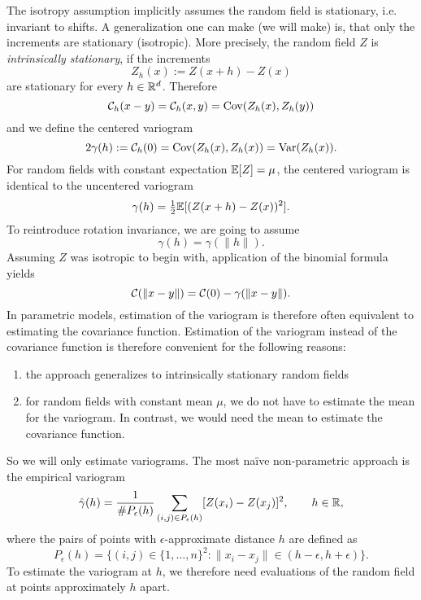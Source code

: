 The isotropy assumption implicitly assumes the random field is stationary,
i.e. invariant to shifts. A generalization one can make (we will make)
is, that only the increments are stationary (isotropic). More precisely, the
random field \(Z\) is \emph{intrinsically stationary}, if the increments
\[
	Z_h(x) := Z(x+h) - Z(x)
\]
are stationary for every \(h\in\mathbb{R}^d\). Therefore
\[
	\mathcal{C}_h(x-y) = \mathcal{C}_h(x,y) = \operatorname{Cov}(Z_h(x), Z_h(y))
\]
and we define the centered variogram
\[
	2\gamma(h):= \mathcal{C}_h(0) = \operatorname{Cov}(Z_h(x), Z_h(x))= \operatorname{Var}(Z_h(x)).
\]
For random fields with constant expectation \(\mathbb{E}[Z]=\mu\), the centered
variogram is identical to the uncentered variogram
\[
	\gamma(h) = \tfrac12\mathbb{E}[(Z(x+h)-Z(x))^2].
\]
To reintroduce rotation invariance, we are going to assume
\[
	\gamma(h)=\gamma(\|h\|).
\]
Assuming \(Z\) was isotropic to begin with, application of the binomial formula
yields
\[
	\mathcal{C}(\|x-y\|) = \mathcal{C}(0) - \gamma(\|x-y\|).
\]
In parametric models, estimation of the variogram is therefore often equivalent
to estimating the covariance function. Estimation of the variogram instead of
the covariance function is therefore convenient for the following reasons:
\begin{enumerate}
	\item the approach generalizes to intrinsically stationary random fields
	\item for random fields with constant mean \(\mu\), we do not have to
	estimate the mean for the variogram. In contrast, we would need the mean
	to estimate the covariance function.
\end{enumerate}
So we will only estimate variograms. The most naïve non-parametric approach
is the empirical variogram
\[
	\hat{\gamma}(h)
	= \frac{1}{\# P_\epsilon(h)}\sum_{(i,j)\in P_\epsilon(h)} [Z(x_i)-Z(x_j)]^2,
	\qquad h\in\mathbb{R},
\]
where the pairs of points with \(\epsilon\)-approximate distance \(h\) are
defined as
\[
	P_\epsilon(h)
	= \bigl\{
		(i,j)\in \{1,\dots,n\}^2 : \|x_i - x_j\| \in (h-\epsilon, h+\epsilon)
	\bigr\}.
\]
To estimate the variogram at \(h\), we therefore need evaluations of the random
field at points approximately \(h\) apart.

